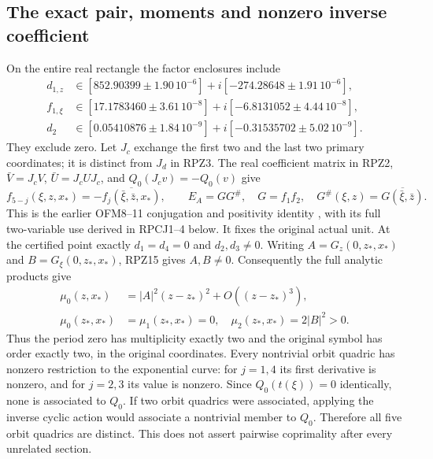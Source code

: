 \documentclass[11pt]{article}
\begin{document}
\subsection{The exact pair, moments and nonzero inverse coefficient}
On the entire real rectangle the factor enclosures include
\[
 \begin{aligned}
 d_{1,z}&\in[852.90399\pm1.90\,10^{-6}]
                   +i[-274.28648\pm1.91\,10^{-6}],\\
 f_{1,\xi}&\in[17.1783460\pm3.61\,10^{-8}]
                   +i[-6.8131052\pm4.44\,10^{-8}],\\
 d_2&\in[0.05410876\pm1.84\,10^{-9}]
                   +i[-0.31535702\pm5.02\,10^{-9}].
 \end{aligned}\tag{RPZ15}
\]
They exclude zero. Let $J_c$ exchange the first two and the last
two primary coordinates; it is distinct from $J_d$ in RPZ3.
The real coefficient matrix in RPZ2, $\bar V=J_cV$,
$\bar U=J_cUJ_c$, and $Q_0(J_cv)=-Q_0(v)$ give
\[
 f_{5-j}(\xi,z,x_*)=-\overline{f_j(\bar\xi,\bar z,x_*)},\qquad
 E_A=G G^\#,\quad G=f_1f_2,\quad
 G^\#(\xi,z)=\overline{G(\bar\xi,\bar z)}.\tag{RPZ16}
\]
This is the earlier OFM8--11 conjugation and positivity identity
\cite{PCLOriginal,Cumulative}, with its full two-variable use
derived in RPCJ1--4 below. It fixes the original actual unit.
At the certified point exactly $d_1=d_4=0$ and $d_2,d_3\ne0$.
Writing $A=G_z(0,z_*,x_*)$ and $B=G_\xi(0,z_*,x_*)$, RPZ15
gives $A,B\ne0$. Consequently the full analytic products give
\[
 \begin{aligned}
 \mu_0(z,x_*)&=|A|^2(z-z_*)^2+O((z-z_*)^3),\\
 \mu_0(z_*,x_*)&=\mu_1(z_*,x_*)=0,\quad
 \mu_2(z_*,x_*)=2|B|^2>0 .
 \end{aligned}\tag{RPZ17}
\]
Thus the period zero has multiplicity exactly two and the original
symbol has order exactly two, in the original coordinates.
Every nontrivial orbit quadric has nonzero restriction to the
exponential curve: for $j=1,4$ its first derivative is nonzero,
and for $j=2,3$ its value is nonzero. Since $Q_0(t(\xi))=0$
identically, none is associated to $Q_0$. If two orbit quadrics
were associated, applying the inverse cyclic action would associate
a nontrivial member to $Q_0$. Therefore all five orbit quadrics
are distinct. This does not assert pairwise coprimality after every
unrelated section.
\end{document}
